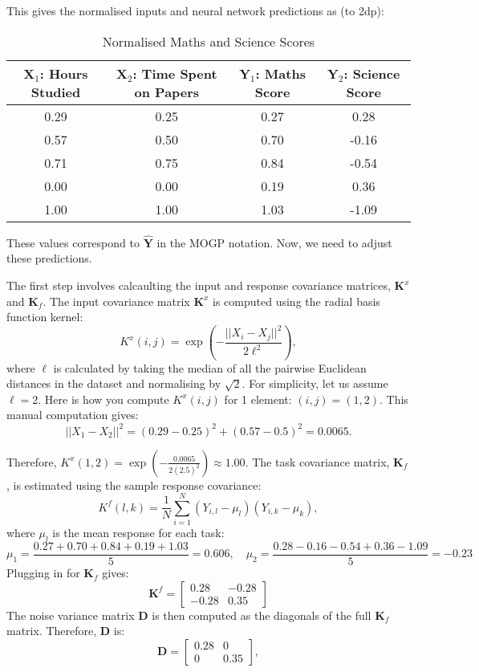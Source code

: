\noindent This gives the normalised inputs and neural network predictions as (to 2dp):
\begin{table}[H]
    \centering
    \begin{tabular}{|c| c | c| c|}
        \hline
        X$_1$: Hours Studied & X$_2$: Time Spent on Papers & 
        Y$_1$: Maths Score & Y$_2$: Science Score  \\
        \hline
        0.29  & 0.25  & 0.27  & 0.28  \\
        0.57  & 0.50   & 0.70  & -0.16  \\
        0.71  & 0.75  & 0.84  & -0.54  \\
        0.00  & 0.00  & 0.19  & 0.36  \\
        1.00  & 1.00  & 1.03  & -1.09  \\
        \hline
    \end{tabular}
    \caption{Normalised Maths and Science Scores}
    \label{tab:normalised_scores}
\end{table}
\noindent These values correspond to $\mathbf{\hat{Y}}$ in the MOGP notation. Now, we need to adjust these predictions.

The first step involves calcaulting the input and response covariance matrices,  \(\mathbf{K}^x\) and  \(\mathbf{K}_f\).
The input covariance matrix \(\mathbf{K}^x\) is computed using the radial basis function kernel:
\[
K^x(i,j) = \exp \left( -\frac{||X_i - X_j||^2}{2 \ell^2} \right),
\]
\noindent where $\ell$ is calculated by taking the median of all the pairwise Euclidean distances in the dataset and normalising by $\sqrt{2}$. For simplicity, let us assume \(\ell = 2\). Here is how you compute $K^x(i,j)$ for 1 element: $(i,j)=(1,2)$. This manual computation gives:
\[
||X_1 - X_2||^2 = (0.29-0.25)^2 + (0.57-0.5)^2 = 0.0065.
\]

\noindent Therefore, $
K^x(1,2) = \exp \left( -\frac{0.0065}{2(2.5)^2} \right) \approx 1.00$.
The task covariance matrix, \(\mathbf{K}_f\), is estimated using the sample response covariance:
\vspace{-0.2cm}
\[
K^f(l, k) = \frac{1}{N} \sum_{i=1}^{N} (Y_{i,l} - \mu_l)(Y_{i,k} - \mu_k),
\]
\noindent where \(\mu_l\) is the mean response for each task:
\[
\mu_1 = \frac{0.27+0.70+0.84+0.19+1.03}{5} = 0.606
,\quad
\mu_2 = \frac{0.28-0.16-0.54+0.36-1.09}{5} = -0.23
\]
\noindent Plugging in for $\mathbf{K}_f$ gives:
\[\mathbf{K}^f =
\begin{bmatrix}
0.28 & -0.28 \\
-0.28 & 0.35
\end{bmatrix}
\]
\noindent The noise variance matrix \(\mathbf{D}\) is then computed as the diagonals of the full $\mathbf{K}_f$ matrix. 
Therefore, \(\mathbf{D}\) is:
\[
\mathbf{D} =
\begin{bmatrix}
0.28 & 0 \\
0 & 0.35
\end{bmatrix},
\]

